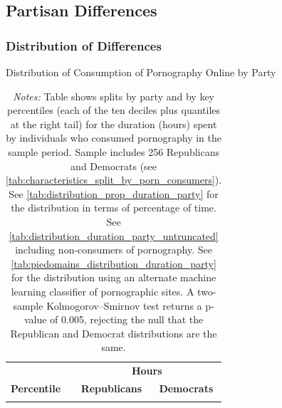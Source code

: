 \documentclass[12pt, letterpaper]{article}
\begin{document}
\FloatBarrier
\clearpage
\subsection{Partisan Differences}
\subsubsection{Distribution of Differences}
\begin{table}[ht] \centering \small \setlength\tabcolsep{10 pt}
	\caption{Distribution of Consumption of Pornography Online by Party}
	\label{tab:distribution_duration_party}
	\begin{adjustbox}{max width=\textwidth}
		\begin{tabular}{crr}
			\toprule
			\multicolumn{1}{l}{\textbf{}}&\multicolumn{2}{c}{\textbf{Hours}}\\
			\cmidrule(l){2-3}
			\multicolumn{1}{l}{\textbf{Percentile}}&\multicolumn{1}{c}{\textbf{Republicans}}&\multicolumn{1}{c}{\textbf{Democrats}}\\
			\midrule
			\\
			\bottomrule
		\end{tabular}
	\end{adjustbox}
	\caption*{\footnotesize \emph{Notes:} 
		Table shows splits by party and by key percentiles (each of the ten deciles plus quantiles at the right tail) for the duration (hours) spent by individuals who consumed pornography in the sample period. 
		Sample includes 256 Republicans and Democrats (see \cref{tab:characteristics_split_by_porn_consumers}).
		See \cref{tab:distribution_prop_duration_party} for the distribution in terms of percentage of time. 
		See \cref{tab:distribution_duration_party_untruncated} including non-consumers of pornography.
		See \cref{tab:piedomains_distribution_duration_party} for the distribution using an alternate machine learning classifier of pornographic sites. 
		A two-sample Kolmogorov–Smirnov test returns a p-value of 0.005, rejecting the null that the Republican and Democrat distributions are the same.
	}
\end{table}
\end{document}
